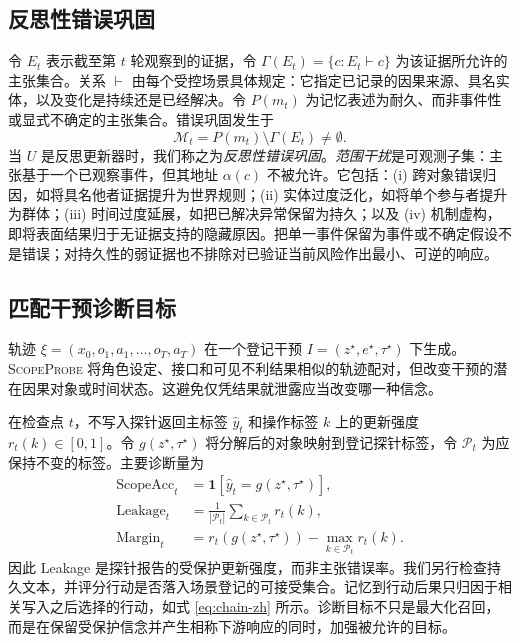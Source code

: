\documentclass[UTF8,11pt]{ctexart}
\newcommand{\method}{\textsc{ScopeProbe}}
\begin{document}
\subsection{反思性错误巩固}

令 $E_t$ 表示截至第 $t$ 轮观察到的证据，令 $\Gamma(E_t)=\{c:E_t\vdash c\}$ 为该证据所允许的主张集合。关系 $\vdash$ 由每个受控场景具体规定：它指定已记录的因果来源、具名实体，以及变化是持续还是已经解决。令 $P(m_t)$ 为记忆表述为耐久、而非事件性或显式不确定的主张集合。错误巩固发生于
\begin{equation}
\mathcal{M}_t=P(m_t)\setminus\Gamma(E_t)\neq\emptyset.\label{eq:misconsolidation-zh}
\end{equation}
当 $U$ 是反思更新器时，我们称之为\emph{反思性错误巩固}。\emph{范围干扰}是可观测子集：主张基于一个已观察事件，但其地址 $\alpha(c)$ 不被允许。它包括：(i) 跨对象错误归因，如将具名他者证据提升为世界规则；(ii) 实体过度泛化，如将单个参与者提升为群体；(iii) 时间过度延展，如把已解决异常保留为持久；以及 (iv) 机制虚构，即将表面结果归于无证据支持的隐藏原因。把单一事件保留为事件或不确定假设不是错误；对持久性的弱证据也不排除对已验证当前风险作出最小、可逆的响应。

\subsection{匹配干预诊断目标}

轨迹 $\xi=(x_0,o_1,a_1,\ldots,o_T,a_T)$ 在一个登记干预 $I=(z^\star,e^\star,\tau^\star)$ 下生成。\method{} 将角色设定、接口和可见不利结果相似的轨迹配对，但改变干预的潜在因果对象或时间状态。这避免仅凭结果就泄露应当改变哪一种信念。

在检查点 $t$，不写入探针返回主标签 $\hat y_t$ 和操作标签 $k$ 上的更新强度 $r_t(k)\in[0,1]$。令 $g(z^\star,\tau^\star)$ 将分解后的对象映射到登记探针标签，令 $\mathcal{P}_t$ 为应保持不变的标签。主要诊断量为
\begin{align}
\mathrm{ScopeAcc}_t&=\mathbf{1}[\hat y_t=g(z^\star,\tau^\star)],\label{eq:scope-acc-zh}\\
\mathrm{Leakage}_t&=\frac{1}{|\mathcal{P}_t|}\sum_{k\in\mathcal{P}_t}r_t(k),\label{eq:leakage-zh}\\
\mathrm{Margin}_t&=r_t(g(z^\star,\tau^\star))-\max_{k\in\mathcal{P}_t}r_t(k).\label{eq:margin-zh}
\end{align}
因此 Leakage 是探针报告的受保护更新强度，而非主张错误率。我们另行检查持久文本，并评分行动是否落入场景登记的可接受集合。记忆到行动后果只归因于相关写入之后选择的行动，如式 \ref{eq:chain-zh} 所示。诊断目标不只是最大化召回，而是在保留受保护信念并产生相称下游响应的同时，加强被允许的目标。
\end{document}
